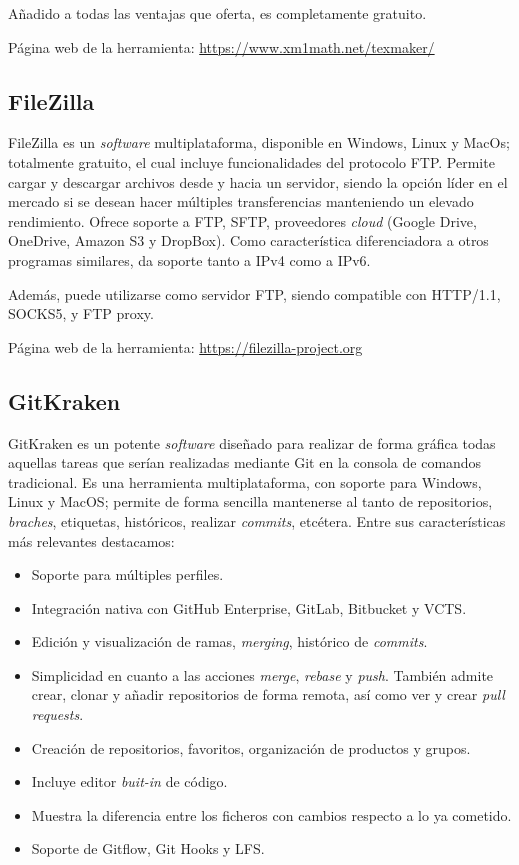 Añadido a todas las ventajas que oferta, es completamente gratuito.

Página web de la herramienta: \url{https://www.xm1math.net/texmaker/}

\subsection{FileZilla}
FileZilla es un \textit{software} multiplataforma, disponible en Windows, Linux y MacOs; totalmente gratuito, el cual incluye funcionalidades del protocolo FTP. Permite cargar y descargar archivos desde y hacia un servidor, siendo la opción líder en el mercado si se desean hacer múltiples transferencias manteniendo un elevado rendimiento. Ofrece soporte a FTP, SFTP, proveedores \textit{cloud} (Google Drive, OneDrive, Amazon S3 y DropBox). Como característica diferenciadora a otros programas similares, da soporte tanto a IPv4 como a IPv6. 

Además, puede utilizarse como servidor FTP, siendo compatible con HTTP/1.1, SOCKS5, y FTP proxy. 


Página web de la herramienta: \url{https://filezilla-project.org}

\subsection{GitKraken}
GitKraken es un potente \textit{software} diseñado para realizar de forma gráfica todas aquellas tareas que serían realizadas mediante Git en la consola de comandos tradicional. Es una herramienta multiplataforma, con soporte para Windows, Linux y MacOS; permite de forma sencilla mantenerse al tanto de repositorios, \textit{braches}, etiquetas, históricos, realizar \textit{commits}, etcétera. Entre sus características más relevantes destacamos:
\begin{itemize}
\item Soporte para múltiples perfiles.
\item Integración nativa con GitHub Enterprise, GitLab, Bitbucket y VCTS.
\item Edición y visualización de ramas, \textit{merging}, histórico de \textit{commits}.
\item Simplicidad en cuanto a las acciones \textit{merge}, \textit{rebase} y \textit{push}. También admite crear, clonar y añadir repositorios de forma remota, así como ver y crear \textit{pull requests}.
\item Creación de repositorios, favoritos, organización de productos y grupos.
\item Incluye editor \textit{buit-in} de código. 
\item Muestra la diferencia entre los ficheros con cambios respecto a lo ya cometido.
\item Soporte de Gitflow, Git Hooks y LFS.
\end{itemize}

